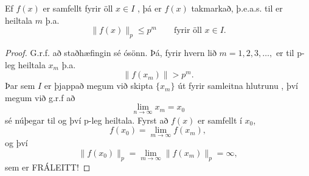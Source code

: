 \begin{setn}
Ef $f(x)$ er samfellt fyrir öll $x\in I$ , þá er $f(x)$ takmarkað, þ.e.a.s. til er heiltala $m$ þ.a. 
\begin{equation*}
\|f(x) \|_p \leq p^m \qquad \mbox{fyrir öll   } x\in I.
\end{equation*}
\end{setn}
\begin{proof}
G.r.f. að staðhæfingin sé ósönn. Þá, fyrir hvern lið $m=1,2,3,\ldots,$ er til p-leg heiltala $x_m$ þ.a.
\begin{equation*}
\|f(x_m)\| > p^m.
\end{equation*}
Þar sem $I$ er þjappað megum við skipta $\{x_m\}$ út fyrir samleitna hlutrunu , því megum við g.r.f að 
\begin{equation*}
\lim_{n \rightarrow \infty} x_m = x_0
\end{equation*}
sé núþegar til og því p-leg heiltala. Fyrst að $f(x)$ er samfellt í $x_0$,
\begin{equation*}
f(x_0) = \lim_{m\rightarrow \infty} f(x_m),
\end{equation*}
og því 
\begin{equation*}
\|f(x_0)\|_p = \lim_{m \rightarrow \infty} \|f(x_m)\|_p = \infty,
\end{equation*}
sem er FRÁLEITT!
\end{proof}


